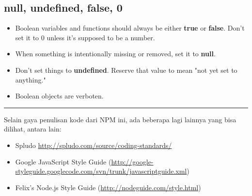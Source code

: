 \subsection{null, undefined, false, 0}

\begin{itemize}
  \item Boolean variables and functions should always be either \textbf{true} or \textbf{false}. Don't set it to 0 unless it's supposed to be a number.
  \item When something is intentionally missing or removed, set it to \textbf{null}.
  \item Don't set things to \textbf{undefined}. Reserve that value to mean "not yet set to anything."
  \item Boolean objects are verboten.
\end{itemize}    

\vspace{10mm}
\hrule
\vspace{10mm}

Selain gaya penulisan kode dari NPM ini, ada beberapa lagi lainnya yang bisa dilihat, antara lain:

\begin{itemize}
  \item Spludo \url{http://spludo.com/source/coding-standards/}
  \item Google JavaScript Style Guide (\url{http://google-styleguide.googlecode.com/svn/trunk/javascriptguide.xml})
  \item Felix's Node.js Style Guide (\url{http://nodeguide.com/style.html})
\end{itemize}
